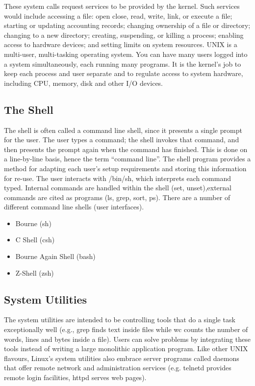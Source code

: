 \documentclass{article}
\begin{document}
These system calls request services to be provided by the kernel. Such services would include accessing a file: open close, read, write, link, or execute a file; starting or updating accounting records; changing ownership of a file or directory; changing to a new directory; creating, suspending, or killing a process; enabling access to hardware devices; and setting limits on system resources. UNIX is a multi-user, multi-tasking operating system. You can have many users logged into a system simultaneously, each running many programs. It is the kernel’s job to keep each process and user separate and to regulate access to system hardware,
including CPU, memory, disk and other I/O devices.

\subsection{The Shell}
The shell is often called a command line shell, since it presents a single prompt for the user. The user types a command; the shell invokes that command, and then presents the prompt again when the command has finished. This is done on a line-by-line basis, hence the term “command line”.
The shell program provides a method for adapting each user’s setup requirements and storing this information for re-use. The user interacts with /bin/sh, which interprets each command typed. Internal commands are handled within the shell (set, unset),external commands are cited as programs (ls, grep, sort, ps).
There are a number of different command line shells (user interfaces).
\begin{itemize}
    \item Bourne (sh)
    \item C Shell (csh)
    \item Bourne Again Shell (bash)
    \item Z-Shell (zsh)
\end{itemize}

\subsection{System Utilities}
The system utilities are intended to be controlling tools that do a single task
exceptionally well (e.g., grep finds text inside files while wc counts the number of
words, lines and bytes inside a file). Users can solve problems by integrating these
tools instead of writing a large monolithic application program.
Like other UNIX flavours, Linux's system utilities also embrace server programs
called daemons that offer remote network and administration services (e.g. telnetd
provides remote login facilities, httpd serves web pages).
\end{document}
